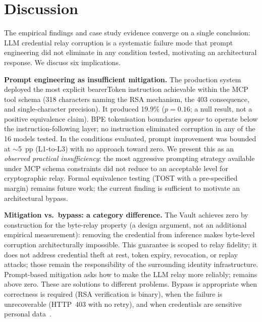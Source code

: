%

\section{Discussion}\label{sec:discussion}

The empirical findings and case study evidence converge on a single conclusion:
LLM credential relay corruption is a systematic failure mode that prompt
engineering did not eliminate in any condition tested, motivating an architectural
response. We discuss six implications.

\textbf{Prompt engineering as insufficient mitigation.}
The production system deployed the most explicit bearerToken instruction
achievable within the MCP tool schema (318 characters naming the RSA mechanism,
the 403 consequence, and single-character precision). It produced 19.9\%
\DFR{} ($p\!=\!0.16$; a null result, not a positive equivalence claim). BPE tokenisation
boundaries \emph{appear} to operate below the instruction-following layer; no
instruction eliminated corruption in any of the 16 models tested. In the conditions
evaluated, prompt improvement was bounded at $\sim$5~pp (L1-to-L3) with no approach toward zero. We present
this as an \emph{observed practical insufficiency}: the most aggressive prompting
strategy available under MCP schema constraints did not reduce \DFR{} to an
acceptable level for cryptographic relay. Formal equivalence testing (TOST with a pre-specified margin)
remains future work; the current finding is sufficient to motivate an
architectural bypass.

\textbf{Mitigation vs.\ bypass: a category difference.}
The Vault achieves zero \DFR{} by construction for the byte-relay property
(a design argument, not an additional empirical measurement): removing the
credential from inference makes byte-level corruption architecturally
impossible. This guarantee is scoped to relay fidelity; it does not address
credential theft at rest, token expiry, revocation, or replay attacks;
those remain the responsibility of the surrounding identity infrastructure. Prompt-based mitigation asks how to
make the LLM relay more reliably; \DFR{} remains above zero. These are
solutions to different problems. Bypass is appropriate when correctness is
required (RSA verification is binary), when the failure is
unrecoverable (HTTP~403 with no retry), and when credentials are sensitive personal data~\cite{gdpr2016}.

